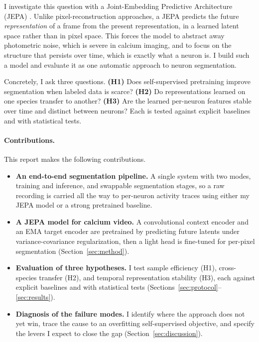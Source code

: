 \documentclass[twoside,11pt]{article}
\begin{document}
I investigate this question with a Joint-Embedding Predictive Architecture (JEPA)
\citep{lecun2022path,assran2023ijepa,bardes2024vjepa}. Unlike pixel-reconstruction approaches, a
JEPA predicts the future \emph{representation} of a frame from the present representation, in a
learned latent space rather than in pixel space. This forces the model to abstract away photometric
noise, which is severe in calcium imaging, and to focus on the structure that persists over time,
which is exactly what a neuron is. I build such a model and evaluate it as one automatic approach to
neuron segmentation.

Concretely, I ask three questions. \textbf{(H1)} Does self-supervised pretraining improve
segmentation when labeled data is scarce? \textbf{(H2)} Do representations learned on one species
transfer to another? \textbf{(H3)} Are the learned per-neuron features stable over time and distinct
between neurons? Each is tested against explicit baselines and with statistical tests.

\paragraph{Contributions.} This report makes the following contributions.
\begin{itemize}
  \item \textbf{An end-to-end segmentation pipeline.} A single system with two modes, training and
    inference, and swappable segmentation stages, so a raw recording is carried all the way to
    per-neuron activity traces using either my JEPA model or a strong pretrained baseline.
  \item \textbf{A JEPA model for calcium video.} A convolutional context encoder and an EMA target
    encoder are pretrained by predicting future latents under variance-covariance regularization,
    then a light head is fine-tuned for per-pixel segmentation (Section~\ref{sec:method}).
  \item \textbf{Evaluation of three hypotheses.} I test sample efficiency (H1), cross-species
    transfer (H2), and temporal representation stability (H3), each against explicit baselines and
    with statistical tests (Sections~\ref{sec:protocol}--\ref{sec:results}).
  \item \textbf{Diagnosis of the failure modes.} I identify where the approach does not yet win, trace
    the cause to an overfitting self-supervised objective, and specify the levers I expect to
    close the gap (Section~\ref{sec:discussion}).
\end{itemize}
\end{document}
